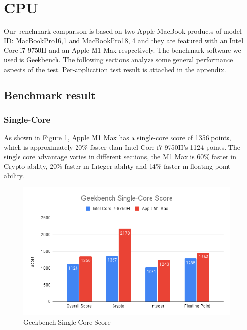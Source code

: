 \documentclass[11pt]{article}
\begin{document}
\newpage
\section{CPU}
Our benchmark comparison is based on two Apple MacBook products of model ID: MacBookPro16,1 and MacBookPro18, 4 and they are featured with an Intel Core i7-9750H and an Apple M1 Max respectively.  The benchmark software we used is Geekbench. The following sections analyze some general performance aspects of the test. Per-application test result is attached in the appendix. 
\subsection*{Benchmark result}
\subsubsection*{Single-Core}
As shown in Figure 1, Apple M1 Max has a single-core score of 1356 points, which is approximately 20\% faster than Intel Core i7-9750H’s 1124 points. The single core advantage varies in different sections, the M1 Max is 60\% faster in Crypto ability, 20\% faster in Integer ability and 14\% faster in floating point ability.
\begin{figure}[h]
    \centering
    \includegraphics[scale = 0.8]{Geekbench Single-Core Score.png}
    \caption{Geekbench Single-Core Score}
	\label{fig:Geekbench Single-Core Score}
\end{figure}
\end{document}
